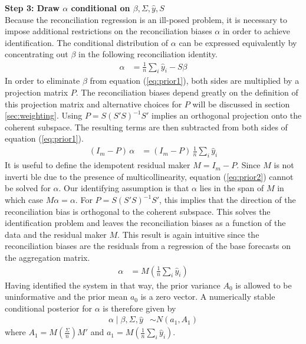 \documentclass[a4paper,fleqn,11pt]{article}
\begin{document}
\noindent\textbf{Step 3: Draw $\alpha$ conditional on $\beta,\Sigma,\hat{y},S$}\\
Because the reconciliation regression is an ill-posed problem, it is necessary to impose additional restrictions on the reconciliation biases $\alpha$ in order to achieve identification. The conditional distribution of $\alpha$ can be expressed equivalently by concentrating out $\beta$ in the following reconciliation identity.
\begin{align}
	\label{eq:prior1}
	\alpha &= \frac{1}{n}\sum_i \hat{y}_i - S\beta
\end{align}
In order to eliminate $\beta$ from equation (\ref{eq:prior1}), both sides are multiplied by a projection matrix $P$. The reconciliation biases depend greatly on the definition of this projection matrix and alternative choices for $P$ will be discussed in section \ref{sec:weighting}. Using $P = S(S'S)^{-1}S'$ implies an orthogonal projection onto the coherent subspace. The resulting terms are then subtracted from both sides of equation (\ref{eq:prior1}).
\begin{align}
	\label{eq:prior2}
	(I_m - P)\, \alpha &= (I_m - P)\, \frac{1}{n}\sum_i \hat{y}_i
\end{align}
It is useful to define the idempotent residual maker $M = I_m - P$. Since $M$ is not inverti ble due to the presence of multicollinearity, equation (\ref{eq:prior2}) cannot be solved for $\alpha$. Our identifying assumption is that $\alpha$ lies in the span of $M$ in which case $M\alpha = \alpha$. For $P=S(S'S)^{-1}S'$, this implies that the direction of the reconciliation bias is orthogonal to the coherent subspace. This solves the identification problem and leaves the reconciliation biases as a function of the data and the residual maker $M$. This result is again intuitive since the reconciliation biases are the residuals from a regression of the base forecasts on the aggregation matrix.
\begin{align}
\alpha &= M\left(\frac{1}{n}\sum_i \hat{y}_i\right)
\end{align}
 Having identified the system in that way, the prior variance $A_0$ is allowed to be uninformative and the prior mean $a_0$ is a zero vector. A numerically stable conditional posterior for $\alpha$ is therefore given by
\begin{align}
	\label{eq:alpha}
	\alpha \mid \beta,\Sigma,\hat{y} &\sim N(a_1,A_1)
\end{align}
where $A_1 = M\left(\frac{\Sigma}{n}\right)M'$ and $a_1 = M\left(\frac{1}{n}\sum_i \hat{y}_i\right)$.
\end{document}
